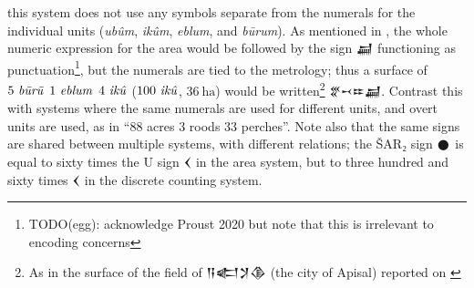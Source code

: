 \documentclass[10pt, a4paper, twoside]{article}
\begin{document}
this system does not use any symbols separate from the numerals
for the individual units (\emph{ubûm}, \emph{ikûm}, \emph{eblum}, and \emph{būrum}).
As mentioned in \cite{Robson2019}, the whole numeric expression for the area would be followed by the sign {\xsuxfont 𒃷}
functioning as punctuation\footnote{TODO(egg): acknowledge Proust 2020
  but note that this is irrelevant to encoding concerns}, but the numerals are tied to the metrology; thus
a surface of $5~\text{\emph{būrū}}$ $1~\text{\emph{eblum}}$ $4~\text{\emph{ikû}}$ ($100~\text{\emph{ikû}}$, $36~\text{ha}$) would be written\footnote{As in the surface of the field of {\xsuxfont 𒀀𒅗𒋡𒆠} (the city of Apisal) reported on \cite[r.~1]{P102305}}
{\xsuxfont 𒐐𒑘𒐂𒃷}. Contrast this with systems
where the same numerals are used for different units,
and overt units are used, as in ``88 acres 3 roods 33 perches''.
Note also that the same signs are shared between multiple systems,
with different relations; the ŠAR₂ sign {\xsuxfont 𒊹} is equal to sixty times the U sign {\xsuxfont 𒌋}
in the area system, but to three hundred and sixty times {\xsuxfont 𒌋} in the discrete counting system.
\end{document}
